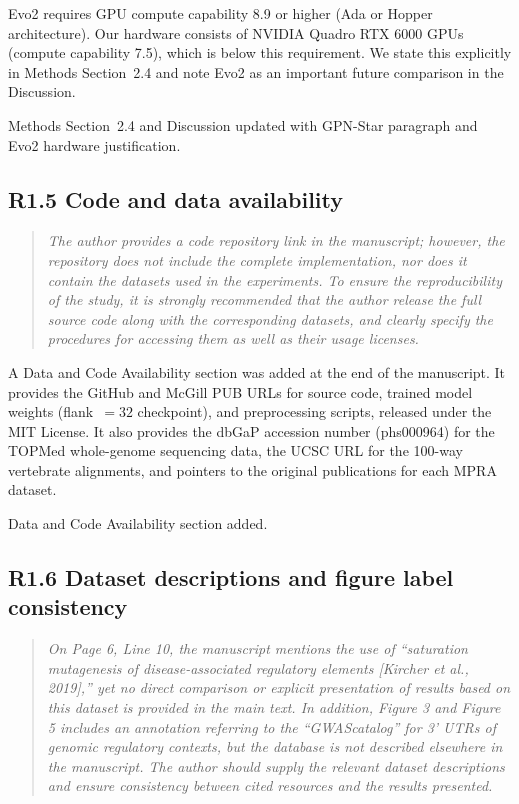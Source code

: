 \documentclass[11pt]{article}
\begin{document}
Evo2 requires GPU compute capability 8.9 or higher (Ada or Hopper
architecture).  Our hardware consists of NVIDIA Quadro RTX 6000 GPUs
(compute capability 7.5), which is below this requirement.  We state
this explicitly in Methods Section~2.4 and note Evo2 as an important
future comparison in the Discussion.

Methods Section~2.4 and Discussion updated with GPN-Star paragraph and
Evo2 hardware justification.

\bigskip

\subsection*{R1.5 Code and data availability}

\begin{quote}
\itshape
The author provides a code repository link in the manuscript; however,
the repository does not include the complete implementation, nor does
it contain the datasets used in the experiments.  To ensure the
reproducibility of the study, it is strongly recommended that the
author release the full source code along with the corresponding
datasets, and clearly specify the procedures for accessing them as
well as their usage licenses.
\end{quote}

A Data and Code Availability section was added at the end of the
manuscript.  It provides the GitHub and McGill PUB URLs for source code, trained model
weights (flank~$= 32$ checkpoint), and preprocessing scripts, released
under the MIT License.  It also provides the dbGaP accession number
(phs000964) for the TOPMed whole-genome sequencing data, the UCSC URL for
the 100-way vertebrate alignments, and pointers to the original
publications for each MPRA dataset.

Data and Code Availability section added.

\bigskip

\subsection*{R1.6 Dataset descriptions and figure label consistency}

\begin{quote}
\itshape
On Page 6, Line 10, the manuscript mentions the use of ``saturation
mutagenesis of disease-associated regulatory elements [Kircher et al.,
2019],'' yet no direct comparison or explicit presentation of results
based on this dataset is provided in the main text.  In addition,
Figure 3 and Figure 5 includes an annotation referring to the
``GWAScatalog'' for 3' UTRs of genomic regulatory contexts, but the
database is not described elsewhere in the manuscript.  The author
should supply the relevant dataset descriptions and ensure consistency
between cited resources and the results presented.
\end{quote}
\end{document}
